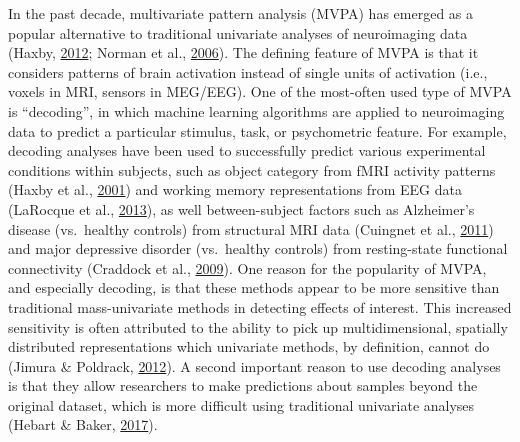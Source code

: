 \documentclass[11pt,american,a4paper,oneside,]{memoir} %
\begin{document}
In the past decade, multivariate pattern analysis (MVPA) has emerged as a popular alternative to traditional univariate analyses of neuroimaging data (Haxby, \protect\hyperlink{ref-Haxby2012-sd}{2012}; Norman et al., \protect\hyperlink{ref-norman2006beyond}{2006}). The defining feature of MVPA is that it considers patterns of brain activation instead of single units of activation (i.e., voxels in MRI, sensors in MEG/EEG). One of the most-often used type of MVPA is ``decoding'', in which machine learning algorithms are applied to neuroimaging data to predict a particular stimulus, task, or psychometric feature. For example, decoding analyses have been used to successfully predict various experimental conditions within subjects, such as object category from fMRI activity patterns (Haxby et al., \protect\hyperlink{ref-Haxby2001-os}{2001}) and working memory representations from EEG data (LaRocque et al., \protect\hyperlink{ref-LaRocque2013-sh}{2013}), as well between-subject factors such as Alzheimer's disease (vs.~healthy controls) from structural MRI data (Cuingnet et al., \protect\hyperlink{ref-Cuingnet2011-hv}{2011}) and major depressive disorder (vs.~healthy controls) from resting-state functional connectivity (Craddock et al., \protect\hyperlink{ref-Craddock2009-kz}{2009}). One reason for the popularity of MVPA, and especially decoding, is that these methods appear to be more sensitive than traditional mass-univariate methods in detecting effects of interest. This increased sensitivity is often attributed to the ability to pick up multidimensional, spatially distributed representations which univariate methods, by definition, cannot do (Jimura \& Poldrack, \protect\hyperlink{ref-Jimura2012-lv}{2012}). A second important reason to use decoding analyses is that they allow researchers to make predictions about samples beyond the original dataset, which is more difficult using traditional univariate analyses (Hebart \& Baker, \protect\hyperlink{ref-Hebart2017-jn}{2017}).
\end{document}
